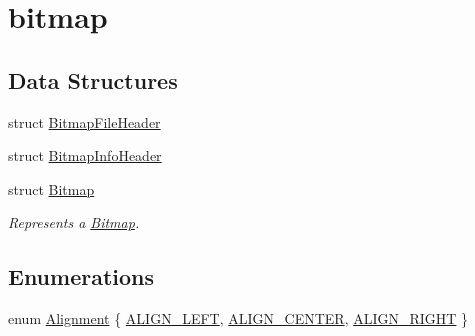 \hypertarget{group__bitmap}{}\section{bitmap}
\label{group__bitmap}
\subsection*{Data Structures}
\begin{DoxyCompactItemize}
\item 
struct \mbox{\hyperlink{struct_bitmap_file_header}{Bitmap\+File\+Header}}
\item 
struct \mbox{\hyperlink{struct_bitmap_info_header}{Bitmap\+Info\+Header}}
\item 
struct \mbox{\hyperlink{struct_bitmap}{Bitmap}}
\begin{DoxyCompactList}\small\item\em Represents a \mbox{\hyperlink{struct_bitmap}{Bitmap}}. \end{DoxyCompactList}\end{DoxyCompactItemize}
\subsection*{Enumerations}
\begin{DoxyCompactItemize}
\item 
enum \mbox{\hyperlink{group__bitmap_gacdfaca60ec19c0265bac2692d7982726}{Alignment}} \{ \mbox{\hyperlink{group__bitmap_ggacdfaca60ec19c0265bac2692d7982726a6ec599857e15466988726932dd592305}{A\+L\+I\+G\+N\+\_\+\+L\+E\+FT}}, 
\mbox{\hyperlink{group__bitmap_ggacdfaca60ec19c0265bac2692d7982726a5624165187e56db612253e608a45b1c6}{A\+L\+I\+G\+N\+\_\+\+C\+E\+N\+T\+ER}}, 
\mbox{\hyperlink{group__bitmap_ggacdfaca60ec19c0265bac2692d7982726a9c81840e8cad46418b39a8b74a246354}{A\+L\+I\+G\+N\+\_\+\+R\+I\+G\+HT}}
 \}
\end{DoxyCompactItemize}
